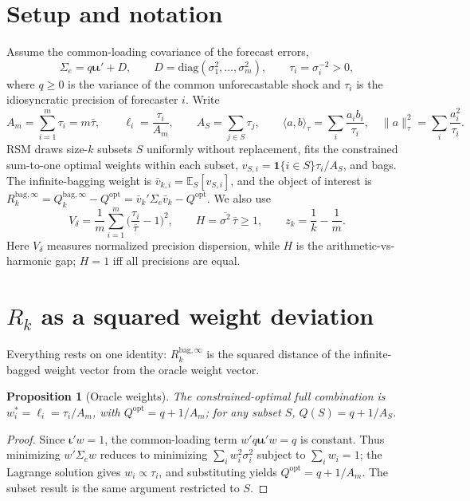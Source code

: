 \documentclass[11pt]{article}
\newcommand{\E}{\mathbb{E}}
\newcommand{\diag}{\mathrm{diag}}
\newcommand{\Sig}{\Sigma_e}
\newcommand{\Rbag}{R_k^{\mathrm{bag},\infty}}
\newcommand{\Qbag}{Q_k^{\mathrm{bag},\infty}}
\newcommand{\Qopt}{Q^{\mathrm{opt}}}
\newcommand{\iotab}{\bm{\iota}}
\newcommand{\inner}[2]{\langle #1,#2\rangle_\tau}
\newtheorem{proposition}{Proposition}
\begin{document}
\section{Setup and notation}
Assume the common-loading covariance of the forecast errors,
\[
  \Sig=q\iotab\iotab'+D,\qquad D=\diag(\sigma_1^2,\dots,\sigma_m^2),\qquad\tau_i=\sigma_i^{-2}>0,
\]
where $q\ge0$ is the variance of the common unforecastable shock and $\tau_i$ is the
idiosyncratic precision of forecaster $i$. Write
\[
  A_m=\sum_{i=1}^m\tau_i=m\bar\tau,\qquad\ell_i=\frac{\tau_i}{A_m},\qquad A_S=\sum_{j\in S}\tau_j,
  \qquad\inner{a}{b}=\sum_i\frac{a_ib_i}{\tau_i},\quad\|a\|_\tau^2=\sum_i\frac{a_i^2}{\tau_i}.
\]
RSM draws size-$k$ subsets $S$ uniformly without replacement, fits the constrained sum-to-one
optimal weights within each subset, $v_{S,i}=\mathbf 1\{i\in S\}\tau_i/A_S$, and bags. The
infinite-bagging weight is $\bar v_{k,i}=\E_S[v_{S,i}]$, and the object of interest is
$\Rbag=\Qbag-\Qopt=\bar v_k'\Sig\bar v_k-\Qopt$. We also use
\[
  V_\delta=\frac1m\sum_{i=1}^m\Big(\frac{\tau_i}{\bar\tau}-1\Big)^2,\qquad
  H=\overline{\sigma^2}\,\bar\tau\ge1,\qquad z_k=\frac1k-\frac1m .
\]
Here $V_\delta$ measures normalized precision dispersion, while $H$ is the
arithmetic-vs-harmonic gap; $H=1$ iff all precisions are equal.

\section{$R_k$ as a squared weight deviation}
Everything rests on one identity: $\Rbag$ is the squared distance of the infinite-bagged
weight vector from the oracle weight vector.

\begin{proposition}[Oracle weights]
The constrained-optimal full combination is $w_i^\ast=\ell_i=\tau_i/A_m$, with $\Qopt=q+1/A_m$;
for any subset $S$, $Q(S)=q+1/A_S$.
\end{proposition}
\begin{proof}
Since $\iotab'w=1$, the common-loading term $w'q\iotab\iotab'w=q$ is constant. Thus minimizing
$w'\Sig w$ reduces to minimizing $\sum_iw_i^2\sigma_i^2$ subject to $\sum_iw_i=1$; the Lagrange
solution gives $w_i\propto\tau_i$, and substituting yields $\Qopt=q+1/A_m$. The subset result
is the same argument restricted to $S$.
\end{proof}
\end{document}
